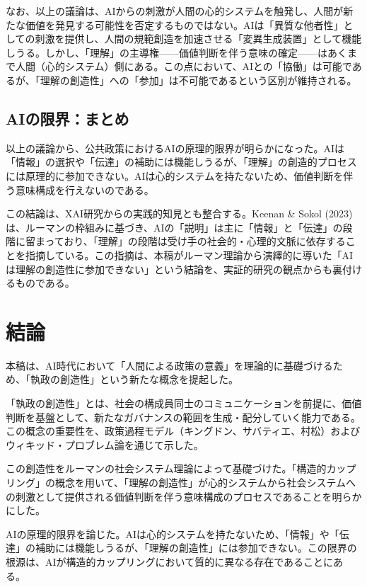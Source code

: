 \documentclass{keikaku}
\begin{document}
なお、以上の議論は、AIからの刺激が人間の心的システムを触発し、人間が新たな価値を発見する可能性を否定するものではない。AIは「異質な他者性」としての刺激を提供し、人間の規範創造を加速させる「変異生成装置」として機能しうる。しかし、「理解」の主導権——価値判断を伴う意味の確定——はあくまで人間（心的システム）側にある。この点において、AIとの「協働」は可能であるが、「理解の創造性」への「参加」は不可能であるという区別が維持される。

\subsection{AIの限界：まとめ}

以上の議論から、公共政策におけるAIの原理的限界が明らかになった。AIは「情報」の選択や「伝達」の補助には機能しうるが、「理解」の創造的プロセスには原理的に参加できない。AIは心的システムを持たないため、価値判断を伴う意味構成を行えないのである。

この結論は、XAI研究からの実践的知見とも整合する。Keenan \& Sokol (2023)は、ルーマンの枠組みに基づき、AIの「説明」は主に「情報」と「伝達」の段階に留まっており、「理解」の段階は受け手の社会的・心理的文脈に依存することを指摘している\cite{keenan2023}。この指摘は、本稿がルーマン理論から演繹的に導いた「AIは理解の創造性に参加できない」という結論を、実証的研究の観点からも裏付けるものである。

\section{結論}

本稿は、AI時代において「人間による政策の意義」を理論的に基礎づけるため、「執政の創造性」という新たな概念を提起した。

「執政の創造性」とは、社会の構成員同士のコミュニケーションを前提に、価値判断を基盤として、新たなガバナンスの範囲を生成・配分していく能力である。この概念の重要性を、政策過程モデル（キングドン、サバティエ、村松）およびウィキッド・プロブレム論を通じて示した。

この創造性をルーマンの社会システム理論によって基礎づけた。「構造的カップリング」の概念を用いて、「理解の創造性」が心的システムから社会システムへの刺激として提供される価値判断を伴う意味構成のプロセスであることを明らかにした。

AIの原理的限界を論じた。AIは心的システムを持たないため、「情報」や「伝達」の補助には機能しうるが、「理解の創造性」には参加できない。この限界の根源は、AIが構造的カップリングにおいて質的に異なる存在であることにある。
\end{document}
